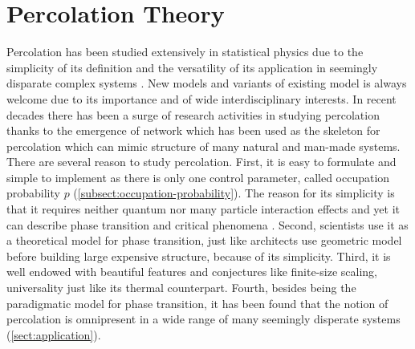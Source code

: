 \chapter{Percolation Theory}
\label{chapter.percolation-theory}
\ifpdf
    \graphicspath{
    	{Chapter4/Figs/}
    	{Chapter4/Figs/playground/}
    	{Chapter4/Figs/entropy_cluster/}
	    {Chapter5/Figs/lattice/}    
}
\else
    \graphicspath{
        {Chapter4/Figs/}
	    {Chapter4/Figs/playground/}
	    {Chapter4/Figs/entropy_cluster/}
	    {Chapter5/Figs/lattice/} 	
    }
\fi

Percolation has been studied extensively in statistical physics due to the simplicity of its definition and the versatility of its application in seemingly disparate complex systems \cite{Sahini1994}. New models and variants of existing model is always welcome due to its importance and of wide interdisciplinary interests. In recent decades there has been a surge of research activities in studying percolation thanks to the emergence of network which has been used as the skeleton for percolation which can mimic structure of many natural and man-made systems.\\


There are several reason to study percolation. First, it is easy to formulate and simple to implement as there is only one control parameter, called occupation probability $p$ (\ref{subsect:occupation-probability}). The reason for its simplicity is that it requires neither quantum nor many particle interaction effects and yet it can describe phase transition and critical phenomena \cite{Saberi2015, Stauffer1994}.  Second, scientists use it as a theoretical model for phase transition, just like architects use geometric model before building large expensive structure, because of its simplicity. Third, it is well endowed with beautiful features and conjectures like finite-size scaling, universality just like its thermal counterpart. Fourth, besides being the paradigmatic model for phase transition, it has been found that the notion of percolation is omnipresent in a wide range of many seemingly disperate systems (\ref{sect:application}).\\

